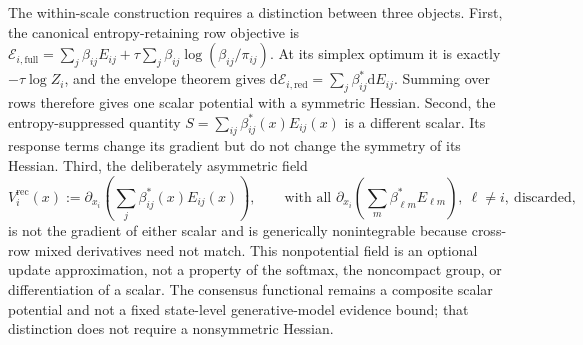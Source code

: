 The within-scale construction requires a distinction between three objects. First, the canonical entropy-retaining row objective is $\mathcal{E}_{i,\mathrm{full}}=\sum_j\beta_{ij}E_{ij}+\tau\sum_j\beta_{ij}\log(\beta_{ij}/\pi_{ij})$. At its simplex optimum it is exactly $-\tau\log Z_i$, and the envelope theorem gives $\mathrm{d}\mathcal{E}_{i,\mathrm{red}}=\sum_j\beta_{ij}^*\mathrm{d}E_{ij}$. Summing over rows therefore gives one scalar potential with a symmetric Hessian. Second, the entropy-suppressed quantity $S=\sum_{ij}\beta_{ij}^*(x)E_{ij}(x)$ is a different scalar. Its response terms change its gradient but do not change the symmetry of its Hessian. Third, the deliberately asymmetric field
\begin{equation}
V_i^{\mathrm{rec}}(x):=\partial_{x_i}\left(\sum_j\beta_{ij}^*(x)E_{ij}(x)\right),
\qquad
\text{with all }\partial_{x_i}\left(\sum_m\beta_{\ell m}^*E_{\ell m}\right),\ \ell\ne i,\ \text{discarded},
\label{eq:receiver_only_field}
\end{equation}
is not the gradient of either scalar and is generically nonintegrable because cross-row mixed derivatives need not match. This nonpotential field is an optional update approximation, not a property of the softmax, the noncompact group, or differentiation of a scalar. The consensus functional remains a composite scalar potential and not a fixed state-level generative-model evidence bound; that distinction does not require a nonsymmetric Hessian.

